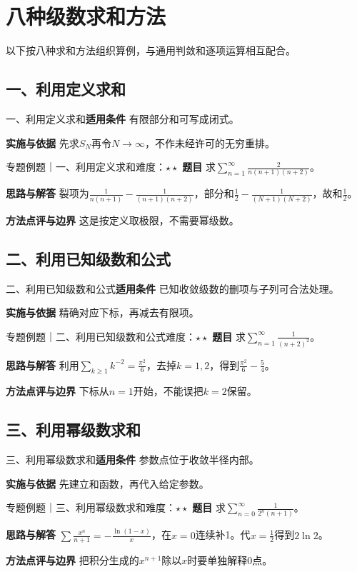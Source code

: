 \section{八种级数求和方法}\label{mat:series_sum8}
\begin{examtip}以下按八种求和方法组织算例，与通用判敛和逐项运算相互配合。\end{examtip}
\subsection{一、利用定义求和}\label{mat:series_sum8:j1}
\begin{method}{一、利用定义求和}\textbf{适用条件} 有限部分和可写成闭式。\par\textbf{实施与依据} 先求$S_N$再令$N\to\infty$，不作未经许可的无穷重排。\end{method}
\begin{example}{专题例题｜一、利用定义求和}{难度：$\star\star$}
\textbf{题目} 求$\sum_{n=1}^\infty\frac{2}{n(n+1)(n+2)}$。\par\textbf{思路与解答} 裂项为$\frac{1}{n(n+1)}-\frac{1}{(n+1)(n+2)}$，部分和$\frac{1}{2}-\frac{1}{(N+1)(N+2)}$，故和$\frac{1}{2}$。\par\textbf{方法点评与边界} 这是按定义取极限，不需要幂级数。
\end{example}
\subsection{二、利用已知级数和公式}\label{mat:series_sum8:j2}
\begin{method}{二、利用已知级数和公式}\textbf{适用条件} 已知收敛级数的删项与子列可合法处理。\par\textbf{实施与依据} 精确对应下标，再减去有限项。\end{method}
\begin{example}{专题例题｜二、利用已知级数和公式}{难度：$\star\star$}
\textbf{题目} 求$\sum_{n=1}^\infty\frac{1}{(n+2)^2}$。\par\textbf{思路与解答} 利用$\sum_{k\ge1}k^{-2}=\frac{\pi^2}{6}$，去掉$k=1,2$，得到$\frac{\pi^2}{6}-\frac{5}{4}$。\par\textbf{方法点评与边界} 下标从$n=1$开始，不能误把$k=2$保留。
\end{example}
\subsection{三、利用幂级数求和}\label{mat:series_sum8:j3}
\begin{method}{三、利用幂级数求和}\textbf{适用条件} 参数点位于收敛半径内部。\par\textbf{实施与依据} 先建立和函数，再代入给定参数。\end{method}
\begin{example}{专题例题｜三、利用幂级数求和}{难度：$\star\star$}
\textbf{题目} 求$\sum_{n=0}^\infty\frac{1}{2^n(n+1)}$。\par\textbf{思路与解答} $\sum \frac{x^n}{n+1}=-\frac{\ln(1-x)}{x}$，在$x=0$连续补1。代$x=\frac{1}{2}$得到$2\ln2$。\par\textbf{方法点评与边界} 把积分生成的$x^{n+1}$除以$x$时要单独解释0点。
\end{example}

